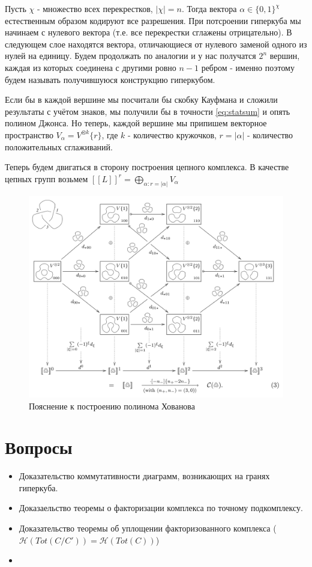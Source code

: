 \documentclass[a4paper,8pt]{extarticle}
\begin{document}
\begin{multicols}{2}
    Пусть $\chi$ - множество всех перекрестков, $|\chi| = n$. Тогда вектора $\alpha \in
    \{0,1\}^\chi$ естественным образом кодируют все разрешения. При
    потсроении гиперкуба мы начинаем с нулевого вектора (т.е. все
    перекрестки сглажены отрицательно). В следующем слое находятся
    вектора, отличающиеся от нулевого заменой одного из нулей на
    единицу. Будем продолжать по аналогии и у нас получатся $2^n$
    вершин, каждая из которых соединена с другими ровно $n-1$ ребром - 
    именно поэтому будем называть получившуюся конструкцию гиперкубом.

    Если бы в каждой вершине мы посчитали бы скобку Кауфмана
    и сложили результаты с учётом знаков, мы получили бы в точности
    \eqref{eq:statsum} и опять полином Джонса. Но теперь, каждой
    вершине мы припишем векторное пространство $V_\alpha = V^{\otimes k}\{r\}$,
    где $k$ - количество кружочков, $r=|\alpha|$ - количество положительных
    сглаживаний.

    Теперь будем двигаться в сторону построения цепного комплекса.
    В качестве цепных групп возьмем $[\![ L ]\!]^r = \bigoplus_{\alpha: r=|\alpha|} V_\alpha$


    \columnbreak
\end{multicols}

\begin{figure}[h]
  \centering
  \includegraphics[width=0.8\linewidth]{../img/bar-natan-2.png}
  \caption{Пояснение к построению полинома Хованова \parencite{bar-natan}}
  \label{fig:bar-natan-2}
\end{figure}

\section{Вопросы}
\begin{itemize}
\item Доказательство коммутативности диаграмм, возникающих на гранях гиперкуба. 
\item Доказаельство теоремы о факторизации комплекса по точному подкомплексу.
\item Доказательство теоремы об уплощении факторизованного комплекса ($\mathcal{H}(Tot(C/C')) = \mathcal{H}(Tot(C))$)
\item 

\end{itemize}
\printbibliography
\end{document}
